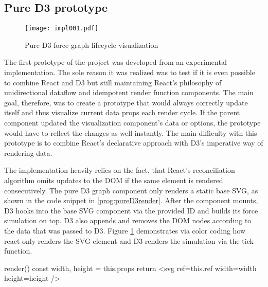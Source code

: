 

\subsection{Pure D3 prototype}

\begin{figure}
\centering
\texttt{[image: impl001.pdf]}
\caption{Pure D3 force graph lifecycle visualization}
\label{fig:pureD3Lifecycle}
\end{figure}

The first prototype of the project was developed from an experimental implementation. The sole reason it was realized was to test if it is even possible to combine React and D3 but still maintaining React's philosophy of unidirectional dataflow and idempotent render function components. The main goal, therefore, was to create a prototype that would always correctly update itself and thus visualize current data props each render cycle. If the parent component updated the visualization component's data or options, the prototype would have to reflect the changes as well instantly. The main difficulty with this prototype is to combine React's declarative approach with D3's imperative way of rendering data.

The implementation heavily relies on the fact, that React's reconciliation algorithm omits updates to the DOM if the same element is rendered consecutively. The pure D3 graph component only renders a static base SVG, as shown in the code snippet in \ref{prog:pureD3render}. After the component mounts, D3 hooks into the base SVG component via the provided ID and builds its force simulation on top. D3 also appends and removes the DOM nodes according to the data that was passed to D3. Figure \ref{fig:pureD3Lifecycle} demonstrates via color coding how react only renders the SVG element and D3 renders the simulation via the tick function.

\begin{program}[H]
\caption{Render function of the pure D3 prototype}
\label{prog:pureD3render}
\begin{JsCode}
render() {
  const { width, height } = this.props
  return <svg ref={this.ref} width={width} height={height} />
}
\end{JsCode}
\end{program}

